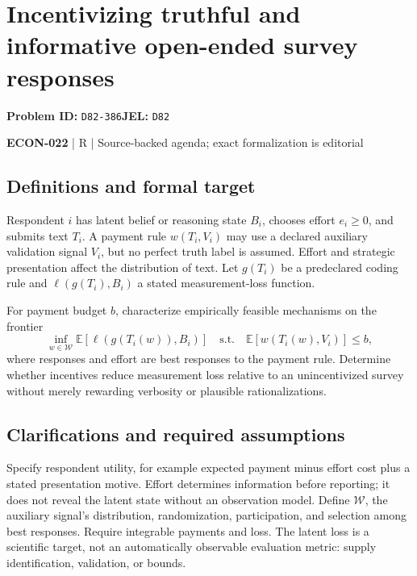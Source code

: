 \documentclass[11pt,a4paper]{article}
\begin{document}
\section*{Incentivizing truthful and informative open-ended survey responses}
\textbf{Problem ID:} \texttt{D82-386}\quad \textbf{JEL:} \texttt{D82}\par
\label{problem:OP-0606}


\label{audited:ECON-022}

{\sffamily\small\color{muted}\textbf{ECON-022} | R | Source-backed agenda; exact formalization is editorial\par}

\subsection*{Definitions and formal target}

Respondent $i$ has latent belief or reasoning state $B_i$, chooses effort $e_i\geq0$, and submits text $T_i$. A payment rule $w(T_i,V_i)$ may use a declared auxiliary validation signal $V_i$, but no perfect truth label is assumed. Effort and strategic presentation affect the distribution of text. Let $g(T_i)$ be a predeclared coding rule and $\ell(g(T_i),B_i)$ a stated measurement-loss function.

For payment budget $b$, characterize empirically feasible mechanisms on the frontier
\[
 \inf_{w\in\mathcal W}\mathbb E[\ell(g(T_i(w)),B_i)]
 \quad\text{s.t.}\quad\mathbb E[w(T_i(w),V_i)]\leq b,
\]
where responses and effort are best responses to the payment rule. Determine whether incentives reduce measurement loss relative to an unincentivized survey without merely rewarding verbosity or plausible rationalizations.

\subsection*{Clarifications and required assumptions}

Specify respondent utility, for example expected payment minus effort cost plus a stated presentation motive. Effort determines information before reporting; it does not reveal the latent state without an observation model. Define \(\mathcal W\), the auxiliary signal's distribution, randomization, participation, and selection among best responses. Require integrable payments and loss. The latent loss is a scientific target, not an automatically observable evaluation metric: supply identification, validation, or bounds.
\end{document}
